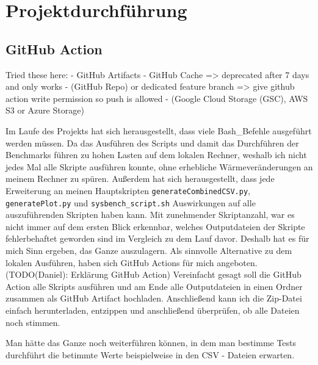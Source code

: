 \chapter{Projektdurchführung}\label{ch:projektdurchfuhrung}

\section{GitHub Action}\label{sec:github-action}

Tried these here:
- GitHub Artifacts
- GitHub Cache => deprecated after 7 days and only works
- (GitHub Repo) or dedicated feature branch => give github action write permission so push is allowed
- (Google Cloud Storage (GSC), AWS S3 or Azure Storage)


Im Laufe des Projekts hat sich herausgestellt, dass viele Bash\_Befehle ausgeführt werden müssen.
Da das Ausführen des Scripts und damit das Durchführen der Benchmarks führen zu hohen Lasten auf dem lokalen Rechner, weshalb ich nicht jedes Mal alle Skripte ausführen konnte, ohne erhebliche Wärmeveränderungen an meinem Rechner zu spüren.
Außerdem hat sich herausgestellt, dass jede Erweiterung an meinen Hauptskripten \texttt{generateCombinedCSV.py}, \texttt{generatePlot.py} und \texttt{sysbench\_script.sh} Auswirkungen auf alle auszuführenden Skripten haben kann.
Mit zunehmender Skriptanzahl, war es nicht immer auf dem ersten Blick erkennbar, welches Outputdateien der Skripte fehlerbehaftet geworden sind im Vergleich zu dem Lauf davor.
Deshalb hat es für mich Sinn ergeben, das Ganze auszulagern.
Als sinnvolle Alternative zu dem lokalen Ausführen, haben sich GitHub Actions für mich angeboten.
(TODO(Daniel): Erklärung GitHub Action)
Vereinfacht gesagt soll die GitHub Action alle Skripts ausführen und am Ende alle Outputdateien in einen Ordner zusammen als GitHub Artifact hochladen.
Anschließend kann ich die Zip-Datei einfach herunterladen, entzippen und anschließend überprüfen, ob alle Dateien noch stimmen.

Man hätte das Ganze noch weiterführen können, in dem man bestimme Tests durchführt die betimmte Werte beispielweise in den CSV - Dateien erwarten.

